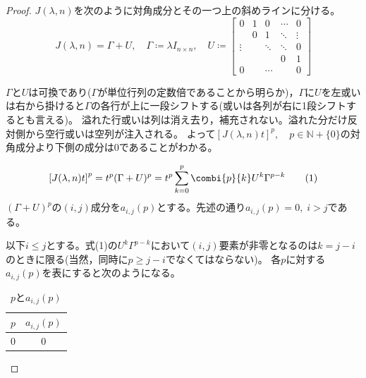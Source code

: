             \begin{proof}
                \quad\par
                $J(\lambda, n)$を次のように対角成分とその一つ上の斜めラインに分ける。
                \[
                    J(\lambda, n)=\Gamma+U,\quad
                    \Gamma\coloneq\lambda I_{n\times n},\quad
                    U\coloneq
                    \begin{bmatrix}
                        0		& 1	& 0			& \cdots	& 0\\
                                & 0	& 1			& \ddots	& \vdots\\
                        \vdots	&	& \ddots	& \ddots	& 0\\
                                & 	& 			& 0			& 1\\
                        0		& 	& \cdots	& 			& 0
                    \end{bmatrix}
                \]
                \par
                $\Gamma$と$U$は可換であり($\Gamma$が単位行列の定数倍であることから明らか)，$\Gamma$に$U$を左或いは右から掛けると$\Gamma$の各行が上に一段シフトする(或いは各列が右に1段シフトするとも言える)。
                溢れた行或いは列は消え去り，補充されない。溢れた分だけ反対側から空行或いは空列が注入される。
                よって$\left[J(\lambda, n)t\right]^p,\quad p\in\mathbb{N}+\{0\}$の対角成分より下側の成分は$0$であることがわかる。
                \par
                \begin{equation}
                    \left[J(\lambda, n)t\right]^p = t^p(\Gamma+U)^p = t^p\sum_{k=0}^{p}{\combi{p}{k}U^k\Gamma^{p-k}} \tag{1}
                \end{equation}
                $(\Gamma+U)^p$の$(i,j)$成分を$a_{i,j}(p)$とする。先述の通り$a_{i,j}(p)=0,\;i>j$である。
                \par
                以下$i\leq j$とする。式(1)の$U^k\Gamma^{p-k}$において$(i,j)$要素が非零となるのは$k=j-i$のときに限る(当然，同時に$p\geq j-i$でなくてはならない)。
                各$p$に対する$a_{i,j}(p)$を表にすると次のようになる。
                \begin{table}[H]
                    \centering
                    \caption{$p$と$a_{i,j}(p)$}
                    \begin{tabular}{cc}
                        $p$			& $a_{i,j}(p)$ \\\hline\hline
                        $0$			& $0$\\

\end{tabular}
\end{table}
\end{proof}
